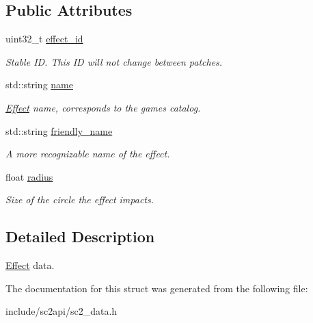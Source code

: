 \subsection*{Public Attributes}
\begin{DoxyCompactItemize}
\item 
\mbox{\label{structsc2_1_1_effect_data_af58e509580b26fbaf610de33e6ac6c06}} 
uint32\+\_\+t \hyperlink{structsc2_1_1_effect_data_af58e509580b26fbaf610de33e6ac6c06}{effect\+\_\+id}
\begin{DoxyCompactList}\small\item\em Stable ID. This ID will not change between patches. \end{DoxyCompactList}\item 
\mbox{\label{structsc2_1_1_effect_data_a23ec611a2d87a280ede5bb7a56b5be2f}} 
std\+::string \hyperlink{structsc2_1_1_effect_data_a23ec611a2d87a280ede5bb7a56b5be2f}{name}
\begin{DoxyCompactList}\small\item\em \hyperlink{structsc2_1_1_effect}{Effect} name, corresponds to the game\textquotesingle{}s catalog. \end{DoxyCompactList}\item 
\mbox{\label{structsc2_1_1_effect_data_a2b82d974d199d9232c0f686019a451f4}} 
std\+::string \hyperlink{structsc2_1_1_effect_data_a2b82d974d199d9232c0f686019a451f4}{friendly\+\_\+name}
\begin{DoxyCompactList}\small\item\em A more recognizable name of the effect. \end{DoxyCompactList}\item 
\mbox{\label{structsc2_1_1_effect_data_a9f91e374d06072d55b6ea6077a0b3884}} 
float \hyperlink{structsc2_1_1_effect_data_a9f91e374d06072d55b6ea6077a0b3884}{radius}
\begin{DoxyCompactList}\small\item\em Size of the circle the effect impacts. \end{DoxyCompactList}\end{DoxyCompactItemize}


\subsection{Detailed Description}
\hyperlink{structsc2_1_1_effect}{Effect} data. 

The documentation for this struct was generated from the following file\+:\begin{DoxyCompactItemize}
\item 
include/sc2api/sc2\+\_\+data.\+h\end{DoxyCompactItemize}
